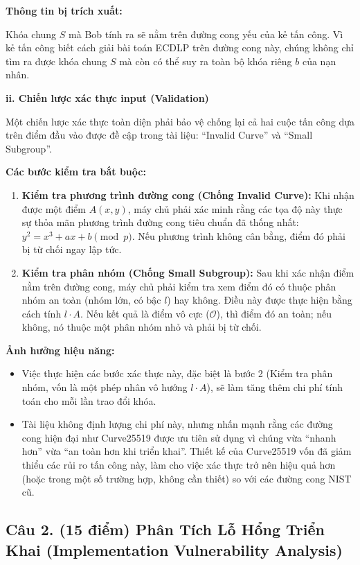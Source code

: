 \textbf{Thông tin bị trích xuất:}

Khóa chung $S$ mà Bob tính ra sẽ nằm trên đường cong yếu của kẻ tấn công. Vì kẻ tấn công biết cách giải bài toán ECDLP trên đường cong này, chúng không chỉ tìm ra được khóa chung $S$ mà còn có thể suy ra toàn bộ khóa riêng $b$ của nạn nhân.

\textbf{ii. Chiến lược xác thực input (Validation)}

Một chiến lược xác thực toàn diện phải bảo vệ chống lại cả hai cuộc tấn công dựa trên điểm đầu vào được đề cập trong tài liệu: ``Invalid Curve'' và ``Small Subgroup''.

\textbf{Các bước kiểm tra bắt buộc:}

\begin{enumerate}
    \item \textbf{Kiểm tra phương trình đường cong (Chống Invalid Curve):} Khi nhận được một điểm $A(x,y)$, máy chủ phải xác minh rằng các tọa độ này thực sự thỏa mãn phương trình đường cong tiêu chuẩn đã thống nhất: $y^2 = x^3 + ax + b \pmod{p}$. Nếu phương trình không cân bằng, điểm đó phải bị từ chối ngay lập tức.
    
    \item \textbf{Kiểm tra phân nhóm (Chống Small Subgroup):} Sau khi xác nhận điểm nằm trên đường cong, máy chủ phải kiểm tra xem điểm đó có thuộc phân nhóm an toàn (nhóm lớn, có bậc $l$) hay không. Điều này được thực hiện bằng cách tính $l \cdot A$. Nếu kết quả là điểm vô cực ($\mathcal{O}$), thì điểm đó an toàn; nếu không, nó thuộc một phân nhóm nhỏ và phải bị từ chối.
\end{enumerate}

\textbf{Ảnh hưởng hiệu năng:}

\begin{itemize}
    \item Việc thực hiện các bước xác thực này, đặc biệt là bước 2 (Kiểm tra phân nhóm, vốn là một phép nhân vô hướng $l \cdot A$), sẽ làm tăng thêm chi phí tính toán cho mỗi lần trao đổi khóa.
    \item Tài liệu không định lượng chi phí này, nhưng nhấn mạnh rằng các đường cong hiện đại như Curve25519 được ưu tiên sử dụng vì chúng vừa ``nhanh hơn'' vừa ``an toàn hơn khi triển khai''. Thiết kế của Curve25519 vốn đã giảm thiểu các rủi ro tấn công này, làm cho việc xác thực trở nên hiệu quả hơn (hoặc trong một số trường hợp, không cần thiết) so với các đường cong NIST cũ.
\end{itemize}

\subsection{Câu 2. (15 điểm) Phân Tích Lỗ Hổng Triển Khai (Implementation Vulnerability Analysis)}

